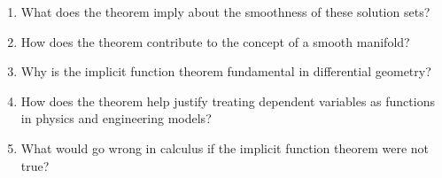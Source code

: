 \begin{enumerate}
\item What does the theorem imply about the smoothness of these solution sets?

\item How does the theorem contribute to the concept of a smooth manifold?

\item Why is the implicit function theorem fundamental in differential geometry?

\item How does the theorem help justify treating dependent variables as functions in physics and engineering models?

\item What would go wrong in calculus if the implicit function theorem were not true?

\end{enumerate}
